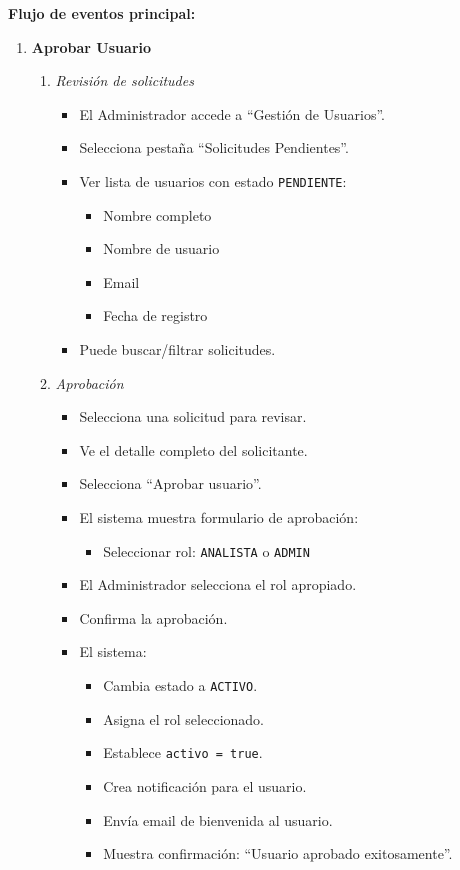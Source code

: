 \vspace{0.5em}
\noindent\textbf{Flujo de eventos principal:}
\begin{enumerate}[nosep]
    \item \textbf{Aprobar Usuario}
    \begin{enumerate}[nosep]
        \item \textit{Revisión de solicitudes}
        \begin{itemize}[nosep]
            \item El Administrador accede a ``Gestión de Usuarios''.
            \item Selecciona pestaña ``Solicitudes Pendientes''.
            \item Ver lista de usuarios con estado \texttt{PENDIENTE}:
            \begin{itemize}[nosep]
                \item Nombre completo
                \item Nombre de usuario
                \item Email
                \item Fecha de registro
            \end{itemize}
            \item Puede buscar/filtrar solicitudes.
        \end{itemize}

        \item \textit{Aprobación}
        \begin{itemize}[nosep]
            \item Selecciona una solicitud para revisar.
            \item Ve el detalle completo del solicitante.
            \item Selecciona ``Aprobar usuario''.
            \item El sistema muestra formulario de aprobación:
            \begin{itemize}[nosep]
                \item Seleccionar rol: \texttt{ANALISTA} o \texttt{ADMIN}
            \end{itemize}
            \item El Administrador selecciona el rol apropiado.
            \item Confirma la aprobación.
            \item El sistema:
            \begin{itemize}[nosep]
                \item Cambia estado a \texttt{ACTIVO}.
                \item Asigna el rol seleccionado.
                \item Establece \texttt{activo = true}.
                \item Crea notificación para el usuario.
                \item Envía email de bienvenida al usuario.
                \item Muestra confirmación: ``Usuario aprobado exitosamente''.
            \end{itemize}
        \end{itemize}
    \end{enumerate}


\end{enumerate}
